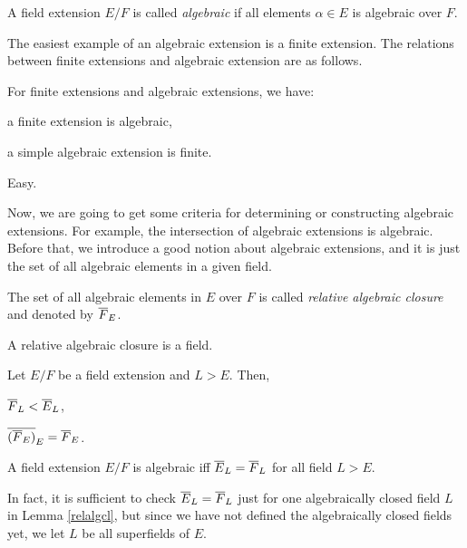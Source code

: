 \documentclass{../exp}
\begin{document}
\begin{rd}
\begin{defn}
A field extension $E/F$ is called \emph{algebraic} if all elements $\alpha\in E$ is algebraic over $F$.
\end{defn}

The easiest example of an algebraic extension is a finite extension.
The relations between finite extensions and algebraic extension are as follows.

\begin{thm}
For finite extensions and algebraic extensions, we have:
\begin{cond}
\item a finite extension is algebraic,
\item a simple algebraic extension is finite.
\end{cond}
\end{thm}
\begin{pf} Easy. \end{pf}


Now, we are going to get some criteria for determining or constructing algebraic extensions.
For example, the intersection of algebraic extensions is algebraic.
Before that, we introduce a good notion about algebraic extensions, and it is just the set of all algebraic elements in a given field.

\begin{defn}
The set of all algebraic elements in $E$ over $F$ is called \emph{relative algebraic closure} and denoted by $\overline F_E$.
\end{defn}
\begin{prop}
A relative algebraic closure is a field.
\end{prop}
\begin{pf}
\end{pf}
\begin{lem}
Let $E/F$ be a field extension and $L>E$.
Then,
\begin{cond}
\item $\overline F_L<\overline E_L$,
\item $\overline{(\overline F_E)}_E=\overline F_E$.
\end{cond}
\begin{pf}
\end{pf}
\end{lem}
\begin{lem}\label{relalgcl}
A field extension $E/F$ is algebraic iff $\overline E_L=\overline F_L$ for all field $L>E$.
\end{lem}
\begin{pf}
\end{pf}
\begin{rmk}
In fact, it is sufficient to check $\overline E_L=\overline F_L$ just for one algebraically closed field $L$ in Lemma \ref{relalgcl}, but since we have not defined the algebraically closed fields yet, we let $L$ be all superfields of $E$.
\end{rmk}


\end{rd}
\end{document}
